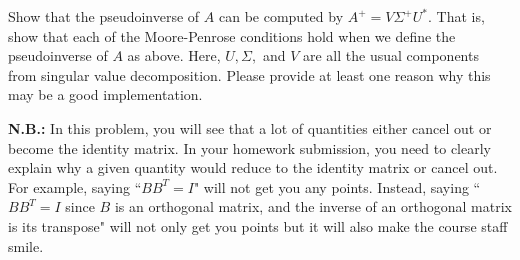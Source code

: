\bigskip
\noindent Show that the pseudoinverse of $A$ can be computed by $A^{+} = V\Sigma^{+}U^*.$ That is, show that each of the Moore-Penrose conditions hold when we define the pseudoinverse of $A$ as above. Here, $U, \Sigma,$ and $V$ are all the usual components from singular value decomposition. Please provide at least one reason why this may be a good implementation.

\textbf{N.B.:} In this problem, you will see that a lot of quantities either cancel out or become the identity matrix. In your homework submission, you need to clearly explain why a given quantity would reduce to the identity matrix or cancel out. For example, saying ``$BB^T = I$" will not get you any points. Instead, saying ``$BB^T = I$ since $B$ is an orthogonal matrix, and the inverse of an orthogonal matrix is its transpose" will not only get you points but it will also make the course staff smile.